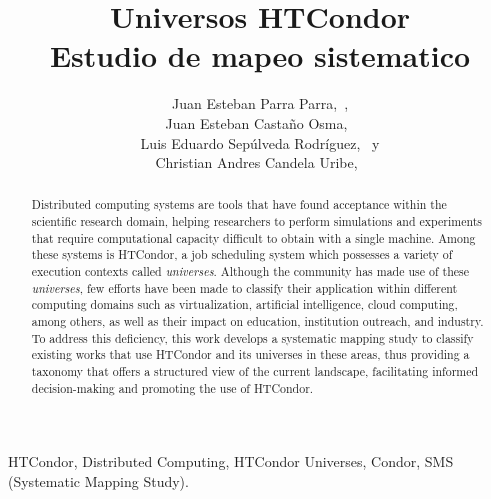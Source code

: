 \documentclass[journal]{IEEEtran}
\begin{document}
\title{
	Universos HTCondor\\
	Estudio de mapeo sistematico
}

\author{
	Juan Esteban Parra Parra,~, \\
	Juan Esteban Castaño Osma,~ \\
	Luis Eduardo Sepúlveda Rodríguez,~ y \\
    Christian Andres Candela Uribe,~
}



\maketitle
\begin{abstract}
    Distributed computing systems are tools that have found acceptance within the scientific research domain,
    helping researchers to perform simulations and experiments that require computational capacity
    difficult to obtain with a single machine. Among these systems is HTCondor, a job scheduling system which possesses a
    variety of execution contexts called \textit{universes}. Although the community has made use of these \textit{universes},
    few efforts have been made to classify their application within different computing domains such as
    virtualization, artificial intelligence, cloud computing, among others,
   as well as their impact on education, institution outreach, and industry. To address this deficiency, this
    work develops a systematic mapping study to classify existing works that use HTCondor and its universes
    in these areas, thus providing a taxonomy that offers a structured view of the current landscape,
    facilitating informed decision-making and promoting the use of HTCondor.
\end{abstract}


\begin{IEEEkeywords}
	HTCondor, Distributed Computing, HTCondor Universes, Condor, SMS (Systematic Mapping Study).
\end{IEEEkeywords}
\end{document}
